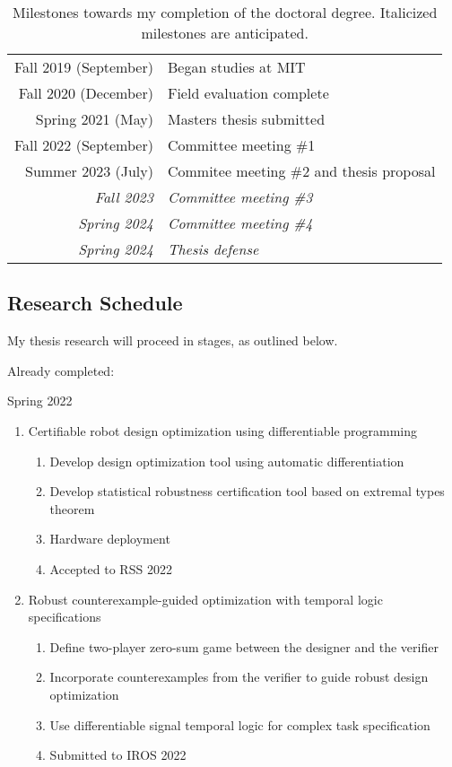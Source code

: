 \begin{table}[h]
\centering
\caption{Milestones towards my completion of the doctoral degree. Italicized milestones are anticipated.}
\label{ch8:tab:degree_milestones}
\begin{tabular}{rl}
Fall 2019 (September)          & Began studies at MIT             \\
Fall 2020 (December)           & Field evaluation complete        \\
Spring 2021 (May)              & Masters thesis submitted         \\
Fall 2022 (September)          & Committee meeting \#1   \\
Summer 2023 (July)             & Commitee meeting \#2 and thesis proposal \\
\textit{Fall 2023}             & \textit{Committee meeting \#3}   \\
\textit{Spring 2024}           & \textit{Committee meeting \#4}   \\
\textit{Spring 2024}           & \textit{Thesis defense}
\end{tabular}
\end{table}

\subsection{Research Schedule}

My thesis research will proceed in stages, as outlined below.

Already completed:

Spring 2022
\begin{enumerate}
    \item Certifiable robot design optimization using differentiable programming
    \begin{enumerate}
        \item Develop design optimization tool using automatic differentiation
        \item Develop statistical robustness certification tool based on extremal types theorem
        \item Hardware deployment
        \item Accepted to RSS 2022
    \end{enumerate}
    \item Robust counterexample-guided optimization with temporal logic specifications
    \begin{enumerate}
        \item Define two-player zero-sum game between the designer and the verifier
        \item Incorporate counterexamples from the verifier to guide robust design optimization
        \item Use differentiable signal temporal logic for complex task specification
        \item Submitted to IROS 2022
    \end{enumerate}
\end{enumerate}

